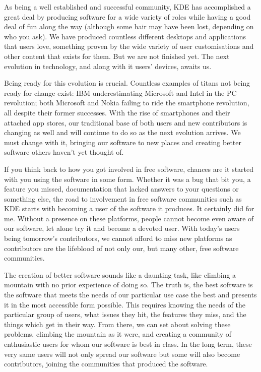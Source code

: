 

\noindent{}As being a well established and successful community, KDE has accomplished a great deal by producing software for a wide variety of roles while having a good deal of fun along the way (although some hair may have been lost, depending on who you ask). We have produced countless different desktops and applications that users love, something proven by the wide variety of user customisations and other content that exists for them. But we are not finished yet. The next evolution in technology, and along with it users' devices, awaits us.

Being ready for this evolution is crucial. Countless examples of titans not being ready for change exist: IBM underestimating Microsoft and Intel in the PC revolution; both Microsoft and Nokia failing to ride the smartphone revolution, all despite their former successes. With the rise of smartphones and their attached app stores, our traditional base of both users and new contributors is changing as well and will continue to do so as the next evolution arrives. We must change with it, bringing our software to new places and creating better software others haven't yet thought of.

If you think back to how you got involved in free software, chances are it started with you using the software in some form. Whether it was a bug that bit you, a feature you missed, documentation that lacked answers to your questions or something else, the road to involvement in free software communities such as KDE starts with becoming a user of the software it produces. It certainly did for me. Without a presence on these platforms, people cannot become even aware of our software, let alone try it and become a devoted user. With today's users being tomorrow's contributors, we cannot afford to miss new platforms  as contributors are the lifeblood of not only our, but many other, free software communities.

The creation of better software sounds like a daunting task, like climbing a mountain with no prior experience of doing so. The truth is, the best software is the software that meets the needs of our particular use case the best and presents it in the most accessible form possible. This requires knowing the needs of the particular group of users, what issues they hit, the features they miss, and the things which get in their way. From there, we can set about solving these problems, climbing the mountain as it were, and creating a community of enthusiastic users for whom our software is best in class. In the long term, these very same users will not only spread our software but some will also become contributors, joining the communities that produced the software.

